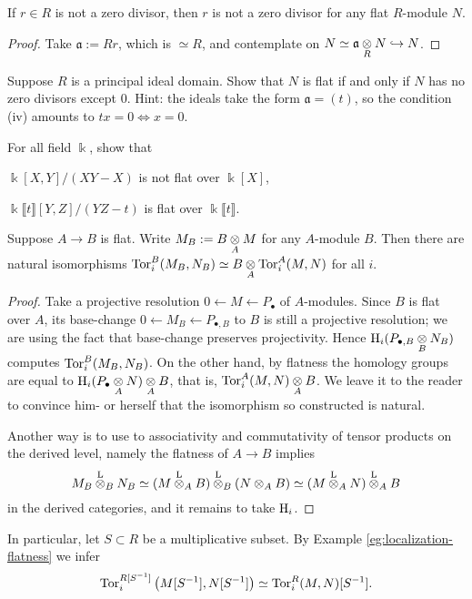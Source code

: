\begin{corollary}
	If $r \in R$ is not a zero divisor, then $r$ is not a zero divisor for any flat $R$-module $N$.
\end{corollary}
\begin{proof}
	Take $\mathfrak{a} :=Rr$, which is $\simeq R$, and contemplate on $N \simeq \mathfrak{a} \underset{R}{\otimes} N \hookrightarrow N$.
\end{proof}

\begin{exercise}
	Suppose $R$ is a principal ideal domain. Show that $N$ is flat if and only if $N$ has no zero divisors except $0$. Hint: the ideals take the form $\mathfrak{a} = (t)$, so the condition (iv) amounts to $tx=0 \iff x=0$.
\end{exercise}

\begin{exercise}
	For all field $\Bbbk$, show that
	\begin{compactenum}[(i)]
		\item $\Bbbk[X,Y]/(XY-X)$ is not flat over $\Bbbk[X]$,
		\item $\Bbbk\llbracket t \rrbracket[Y,Z]/(YZ-t)$ is flat over $\Bbbk\llbracket t\rrbracket$.
	\end{compactenum}
\end{exercise}

\begin{lemma}
	Suppose $A \to B$ is flat. Write $M_B := B \underset{A}{\otimes} M$ for any $A$-module $B$. Then there are natural isomorphisms $\operatorname{Tor}_i^B(M_B, N_B) \simeq B \underset{A}{\otimes} \operatorname{Tor}_i^A(M,N)$ for all $i$.
\end{lemma}
\begin{proof}
	Take a projective resolution $0 \leftarrow M \leftarrow P_\bullet$ of $A$-modules. Since $B$ is flat over $A$, its base-change $0 \leftarrow M_B \leftarrow P_{\bullet,B}$ to $B$ is still a projective resolution; we are using the fact that base-change preserves projectivity. Hence $\operatorname{H}_i(P_{\bullet,B} \underset{B}{\otimes} N_B)$ computes $\operatorname{Tor}_i^B(M_B, N_B)$. On the other hand, by flatness the homology groups are equal to $\operatorname{H}_i(P_\bullet \underset{A}{\otimes} N) \underset{A}{\otimes} B$, that is, $\operatorname{Tor}_i^A(M,N) \underset{A}{\otimes} B$. We leave it to the reader to convince him- or herself that the isomorphism so constructed is natural.
	
	Another way is to use to associativity and commutativity of tensor products on the derived level, namely the flatness of $A \to B$ implies
	\[ M_B \overset{\mathrm{L}}{\otimes}_B N_B \simeq (M \overset{\mathrm{L}}{\otimes}_A B) \overset{\mathrm{L}}{\otimes}_B (N \otimes_A B) \simeq (M \overset{\mathrm{L}}{\otimes}_A N) \overset{\mathrm{L}}{\otimes}_A B \]
	in the derived categories, and it remains to take $\operatorname{H}_i$.
\end{proof}
In particular, let $S \subset R$ be a multiplicative subset. By Example \ref{eg:localization-flatness} we infer
\[ \operatorname{Tor}_i^{R[S^{-1}]}\left( M[S^{-1}], N[S^{-1}] \right) \simeq \operatorname{Tor}_i^R(M,N)[S^{-1}]. \]

